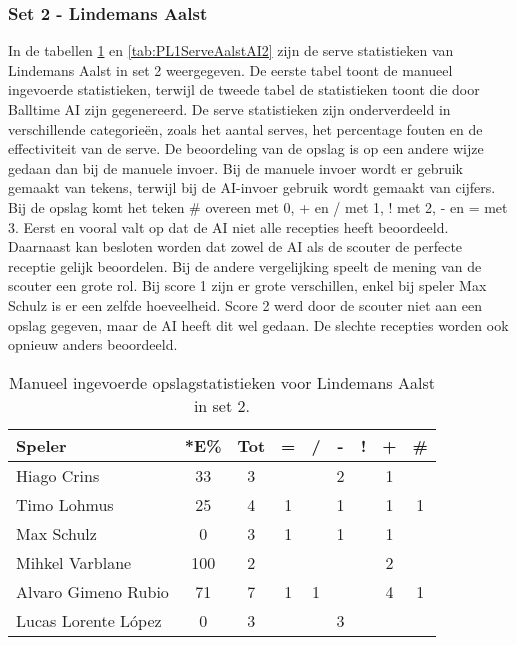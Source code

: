 \subsubsection{Set 2 - Lindemans Aalst}
\label{sec:PL1_Aalst2}
In de tabellen \ref{tab:PL1ServeAalstMan2} en \ref{tab:PL1ServeAalstAI2} zijn de serve statistieken van Lindemans Aalst in set 2 weergegeven. De eerste tabel toont de manueel ingevoerde statistieken, terwijl de tweede tabel de statistieken toont die door Balltime AI zijn gegenereerd. De serve statistieken zijn onderverdeeld in verschillende categorieën, zoals het aantal serves, het percentage fouten en de effectiviteit van de serve. De beoordeling van de opslag is op een andere wijze gedaan dan bij de manuele invoer. Bij de manuele invoer wordt er gebruik gemaakt van tekens, terwijl bij de AI-invoer gebruik wordt gemaakt van cijfers. Bij de opslag komt het teken \# overeen met 0, + en / met 1, ! met 2, - en = met 3. Eerst en vooral valt op dat de AI niet alle recepties heeft beoordeeld. Daarnaast kan besloten worden dat zowel de AI als de scouter de perfecte receptie gelijk beoordelen. Bij de andere vergelijking speelt de mening van de scouter een grote rol. Bij score 1 zijn er grote verschillen, enkel bij speler Max Schulz is er een zelfde hoeveelheid. Score 2 werd door de scouter niet aan een opslag gegeven, maar de AI heeft dit wel gedaan. De slechte recepties worden ook opnieuw anders beoordeeld.

\begin{table}[ht!]
  \centering
  \scriptsize
    \begin{tabular}{|l|c|c|c|c|c|c|c|c|} \hline
      \textbf{Speler} & *E\% & Tot & = & / & - & ! & + & \# \\ \hline
      Hiago Crins & 33 & 3 &  &  & 2 &  & 1 & \\ 
      Timo Lohmus & 25 & 4 & 1 &  & 1 & & 1 & 1 \\ 
      Max Schulz & 0 & 3 & 1 &  & 1 &  & 1 &  \\ 
      Mihkel Varblane & 100 & 2 &  &  &  &  & 2 & \\
      Alvaro Gimeno Rubio & 71 & 7 & 1 & 1 &  &  & 4 & 1\\
      Lucas Lorente López & 0 & 3 &  &  & 3 &  &  &  \\ \hline
  \end{tabular}
  \caption[Manueel ingevoerde opslagstatistieken voor Lindemans Aalst in set 2]{\label{tab:PL1ServeAalstMan2}Manueel ingevoerde opslagstatistieken voor Lindemans Aalst in set 2.}
\end{table}

